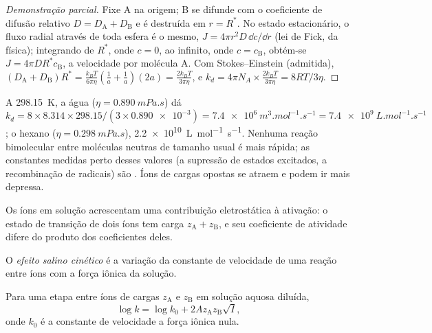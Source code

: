 \begin{proof}[Demonstração parcial]
Fixe A na origem; B se difunde com o coeficiente de difusão relativo $D =
D_{\mathrm A} + D_{\mathrm B}$ e é destruída em $r = R^*$. No estado estacionário, o fluxo radial
através de toda esfera é o mesmo, $J = 4\pi r^2D\,\dd c/\dd r$ (lei de Fick, da
física); integrando de $R^*$, onde $c = 0$, ao infinito, onde $c = c_{\mathrm B}$, obtém-se
$J = 4\pi DR^*c_{\mathrm B}$, a velocidade por molécula A. Com Stokes--Einstein (admitida),
$(D_{\mathrm A} + D_{\mathrm B})R^* = \frac{k_BT}{6\pi\eta}(\frac{1}{a} + \frac1a)(2a) = \frac{2k_BT}{3\pi\eta}$, e $k_d = 4\pi N_A \times
\frac{2k_BT}{3\pi\eta} = 8RT/3\eta$.
\end{proof}

\begin{example}\label{ex:b3:rate-theories:speed-limit}
A \qty{298.15}{K}, a água ($\eta = \qty{0.890}{mPa.s}$) dá $k_d = 8 \times 8.314 \times
298.15/(3 \times \num{0.890e-3}) = \qty{7.4e6}{m^3.mol^{-1}.s^{-1}} = \qty{7.4e9}{L.mol^{-1}.s^{-1}}$; o hexano
($\eta = \qty{0.298}{mPa.s}$), \qty{2.2e10}{L.mol^{-1}.s^{-1}}. Nenhuma reação bimolecular entre
moléculas neutras de tamanho usual é mais rápida; as constantes medidas perto
desses valores (a supressão de estados excitados, a recombinação de radicais) são
. Íons de cargas opostas se atraem e podem ir mais depressa.
\end{example}

Os íons em solução acrescentam uma contribuição eletrostática à ativação: o
estado de transição de dois íons tem carga $z_{\mathrm A} + z_{\mathrm B}$, e seu coeficiente de
atividade difere do produto dos coeficientes deles.

\begin{definition}\label{def:b3:rate-theories:salt}
O \emph{efeito salino cinético} é a variação da
constante de velocidade de uma reação entre íons com a força iônica da solução.
\end{definition}

\begin{proposition}\label{prop:b3:rate-theories:bronsted-bjerrum}
Para uma etapa entre íons de cargas $z_{\mathrm A}$ e $z_{\mathrm B}$ em solução aquosa diluída,
\[
  \log k = \log k_0 + 2Az_{\mathrm A}z_{\mathrm B}\sqrt I,
\]
onde $k_0$ é a constante de velocidade a força iônica nula.
\end{proposition}

